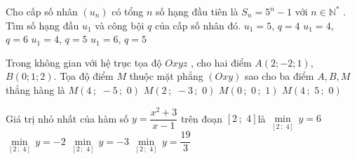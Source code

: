 \begin{ex}%
 Cho cấp số nhân $\left(u_n\right)$ có tổng $n$ số hạng đầu tiên là $S_n=5^n-1$ với $n\in{\mathbb{N}^*}$ . Tìm số hạng đầu $u_1$ và công bội $q$ của cấp số nhân đó.
 \choice
 {$u_1=5$, $q=4$}
 {$u_1=4$, $q=6$}
 {\True $u_1=4$, $q=5$}
 {$u_1=6$, $q=5$}
\end{ex}
\begin{ex}%
 Trong không gian với hệ trục tọa độ $Oxyz$ , cho hai điểm $ A(2;-2;1)$, $B(0;1;2)$. Tọa độ điểm $ M$ thuộc mặt phẳng $\left(Oxy\right)$ sao cho ba điểm $ A,B, M$ thẳng hàng là
 \choice
 {\True $M\left(4\,;\,\,-5\,;\,\,0\right)$}
 {$M\left(2\,;\,\,-3\,;\,\,0\right)$}
 {$M\left(0\,;\,\,0\,;\,\,1\right)$}
 {$M\left(4\,;\,\,5\,;\,\,0\right)$}
\end{ex}

\begin{ex}%
 Giá trị nhỏ nhất của hàm số $ y=\dfrac{x^2+3}{x-1}$ trên đoạn $\left[2\,;\,\,4\right]$là
 \choice
 {\True $\underset{\left[2\,;\,\,4\right]}{\min}\,y=6$}
 {$\underset{\left[2\,;\,\,4\right]}{\min}\,y=-2$}
 {$\underset{\left[2\,;\,\,4\right]}{\min}\,y=-3$}
 {$\underset{\left[2\,;\,\,4\right]}{\min}\,y=\dfrac{19}{3}$}
 \loigiai{
 Chọn A.\\
 Ta có $y'=\dfrac{2x\left(x-1\right)-\left(x^2+3\right)}{x-1}=\dfrac{x^2-2x-3}{\left(x-1\right)^2}$; $y'=0\Rightarrow{x^2}-2x-3=0\Rightarrow\left[\begin{aligned}
 & x=-1\notin\left(2\,;\,\,4\right)\\ 
 & x=3\in\left(2\,;\,\,4\right)\\ 
 \end{aligned}\right.$.\\
 Ta có:$ y(2)=7$, $ y(3)=6$, $ y(4)=\dfrac{19}{3}$. Vậy $\underset{\left[2\,;\,\,4\right]}{\min}\,y=y(3)=6$.}
\end{ex}

